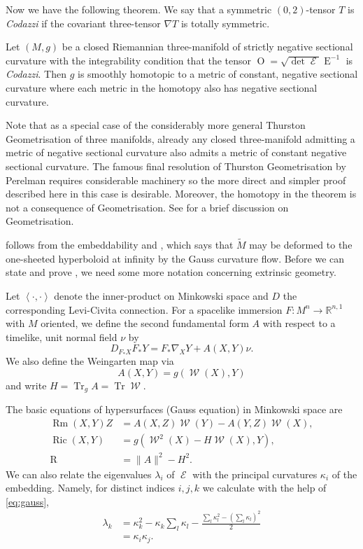 \documentclass{cambridge7a}
\renewcommand{\~}{\tilde}
\renewcommand{\-}{\bar}
\newcommand{\cn}{\colon}
\newcommand{\R}{\mathbb{R}}
\newcommand{\8}{\infty}
\newcommand{\inpr}[2]{\left\langle #1,#2 \right\rangle}
\DeclareMathOperator{\Tr}{Tr}
\DeclareMathOperator{\Ric}{Ric}
\DeclareMathOperator{\Rm}{Rm}
\DeclareMathOperator{\Sc}{R}
\DeclareMathOperator{\Ein}{E}
\DeclareMathOperator{\opEin}{\mathcal{E}}
\DeclareMathOperator{\W}{\mathcal{W}}
\newcommand{\eq}[1]{\begin{equation}\begin{alignedat}{2} #1 \end{alignedat}\end{equation}}
\DeclareMathOperator{\Ob}{O}
\begin{document}
Now we have the following theorem. We say that a symmetric \((0,2)\)-tensor \(T\) is \emph{Codazzi} if the covariant three-tensor \(\nabla T\) is totally symmetric.

\begin{thm}
\label{thm:intg_const_curv}

Let \((M, g)\) be a closed Riemannian three-manifold of strictly negative sectional curvature with the integrability condition that the tensor \(\Ob = \sqrt{\det \opEin} \Ein^{-1}\) is \emph{Codazzi}. Then \(g\) is smoothly homotopic to a metric of constant, negative sectional curvature where each metric in the homotopy also has negative sectional curvature.
\end{thm}

Note that as a special case of the considerably more general Thurston Geometrisation of three manifolds, already any closed three-manifold admitting a metric of negative sectional curvature also admits a metric of constant negative sectional curvature. The famous final resolution of Thurston Geometrisation by Perelman requires considerable machinery so the more direct and simpler proof described here in this case is desirable. Moreover, the homotopy in the theorem is not a consequence of Geometrisation. See  for a brief discussion on Geometrisation.

 follows from the embeddability  and \cite[Theorem 1.1]{MR3344442}, which says that \(\tilde M\) may be deformed to the one-sheeted hyperboloid at infinity by the Gauss curvature flow.
Before we can state and prove , we need some more notation concerning extrinsic geometry.

Let \(\inpr{\cdot}{\cdot}\) denote the inner-product on Minkowski space and \(D\) the corresponding Levi-Civita connection. For a spacelike immersion \(F\cn M^n \to \R^{n,1}\) with \(M\) oriented, we define the second fundamental form $A$ with respect to a timelike, unit normal field $\nu$ by
\[
D_{F_{\ast} X} F_{\ast} Y = F_{\ast} \nabla_X Y + A(X,Y)\nu.
\]
We also define the Weingarten map via
\[
A(X, Y) =  g(\W(X), Y)
\]
and write $H = \Tr_{g}A = \Tr \W$.

The basic equations of hypersurfaces (Gauss equation) in Minkowski space are
\begin{equation}
\label{eq:gauss}
\begin{split}
\Rm(X, Y) Z &= A(X, Z) \W(Y) - A(Y, Z) \W(X), \\
\Ric(X, Y) &= g(\W^2(X) - H \W(X), Y), \\
\Sc &= \|A\|^2 - H^2.
\end{split}
\end{equation}
We can also relate the eigenvalues $\lambda_{i}$ of $\opEin$ with the principal curvatures $\kappa_{i}$ of the embedding. Namely, for distinct indices \(i,j,k\) we calculate with the help of \eqref{eq:gauss},
\eq{
\lambda_k & = \kappa_k^2 - \kappa_k \sum_l \kappa_l - \frac{\sum_l \kappa_l^2 - (\sum_l \kappa_l)^2}{2} \\
&= \kappa_i \kappa_j.
}
\end{document}
